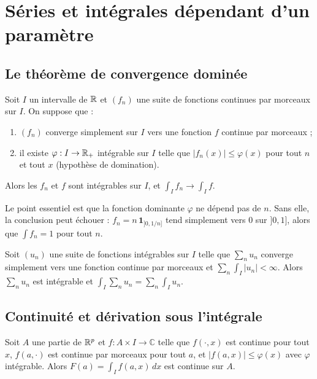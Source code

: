 \section{Séries et intégrales dépendant d'un paramètre}\label{appA:sec:param}

\subsection{Le théorème de convergence dominée}

\begin{theorem}\label{appA:thm:cvd}
Soit $I$ un intervalle de $\mathbb{R}$ et $(f_n)$ une suite de fonctions continues par morceaux sur $I$. On suppose que :
\begin{enumerate}
\item $(f_n)$ converge simplement sur $I$ vers une fonction $f$ continue par morceaux ;
\item il existe $\varphi:I\to\mathbb{R}_+$ intégrable sur $I$ telle que $|f_n(x)|\le\varphi(x)$ pour tout $n$ et tout $x$
(hypothèse de domination).
\end{enumerate}
Alors les $f_n$ et $f$ sont intégrables sur $I$, et $\int_If_n\to\int_If$.
\end{theorem}

Le point essentiel est que la fonction dominante $\varphi$ ne dépend pas de $n$. Sans elle, la conclusion peut échouer :
$f_n=n\,\mathbf 1_{]0,1/n]}$ tend simplement vers $0$ sur $]0,1]$, alors que $\int f_n=1$ pour tout $n$.

\begin{theorem}\label{appA:thm:serieint}
Soit $(u_n)$ une suite de fonctions intégrables sur $I$ telle que $\sum_n u_n$ converge simplement vers une fonction
continue par morceaux et $\sum_n\int_I|u_n|<\infty$. Alors $\sum_nu_n$ est intégrable et
$\int_I\sum_nu_n=\sum_n\int_Iu_n$.
\end{theorem}

\subsection{Continuité et dérivation sous l'intégrale}

\begin{theorem}\label{appA:thm:cont}
Soit $A$ une partie de $\mathbb{R}^p$ et $f:A\times I\to\mathbb{C}$ telle que $f(\cdot,x)$ est continue pour tout $x$, $f(a,\cdot)$ est
continue par morceaux pour tout $a$, et $|f(a,x)|\le\varphi(x)$ avec $\varphi$ intégrable. Alors
$F(a)=\int_If(a,x)\,dx$ est continue sur $A$.
\end{theorem}


